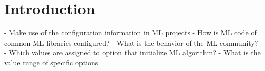 \section{Introduction}\label{sec:introduction}
- Make use of the configuration information in ML projects
- How is ML code of common ML libraries configured?
- What is the behavior of the ML community?
- Which values are assigned to option that initialize ML algorithm?
- What is the value range of specific options